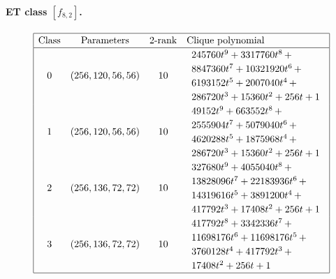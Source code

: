\documentclass[12pt,a4paper]{article}
\begin{document}
\paragraph*{ET class $[f_{8,2}]$.}

\small{}
\begin{align*}
\def\arraystretch{1.2}
\begin{array}{|cccl|}
\hline
\text{Class} &
\text{Parameters} &
\text{2-rank} &
\text{Clique polynomial}
\\
\hline
0 &
(256, 120, 56, 56) &
10 &
\begin{array}{l}
245760t^{9} + 3317760t^{8}
\,+
\\
 8847360t^{7} + 10321920t^{6}
\,+
\\
 6193152t^{5} + 2007040t^{4}
\,+
\\
 286720t^{3} + 15360t^{2} + 256t + 1
\end{array}
\\
1 &
(256, 120, 56, 56) &
10 &
\begin{array}{l}
49152t^{9} + 663552t^{8}
\,+
\\
 2555904t^{7} + 5079040t^{6}
\,+
\\
 4620288t^{5} + 1875968t^{4}
\,+
\\
 286720t^{3} + 15360t^{2} + 256t + 1
\end{array}
\\
2 &
(256, 136, 72, 72) &
10 &
\begin{array}{l}
327680t^{9} + 4055040t^{8}
\,+
\\
 13828096t^{7} + 22183936t^{6}
\,+
\\
 14319616t^{5} + 3891200t^{4}
\,+
\\
 417792t^{3} + 17408t^{2} + 256t + 1
\end{array}
\\
3 &
(256, 136, 72, 72) &
10 &
\begin{array}{l}
417792t^{8} + 3342336t^{7}
\,+
\\
 11698176t^{6} + 11698176t^{5}
\,+
\\
 3760128t^{4} + 417792t^{3}
\,+
\\
 17408t^{2} + 256t + 1
\end{array}
\\
\hline
\end{array}
\end{align*}
\end{document}
